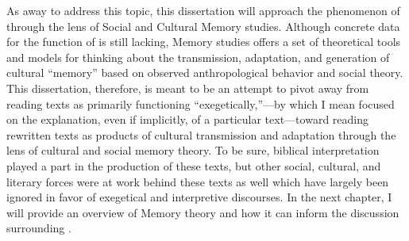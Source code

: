 As away to address this topic, this dissertation will approach the phenomenon of \rwb through the lens of Social and Cultural Memory studies. Although concrete data for the function of \rwb is still lacking, Memory studies offers a set of theoretical tools and models for thinking about the transmission, adaptation, and generation of cultural ``memory'' based on observed anthropological behavior and social theory. This dissertation, therefore, is meant to be an attempt to pivot away from reading \rwb texts as primarily functioning ``exegetically,''---by which I mean focused on the explanation, even if implicitly, of a particular text---toward reading rewritten texts as products of cultural transmission and adaptation through the lens of cultural and social memory theory. To be sure, biblical interpretation played a part in the production of these texts, but other social, cultural, and literary forces were at work behind these texts as well which have largely been ignored in favor of exegetical and interpretive discourses. In the next chapter, I will provide an overview of Memory theory and how it can inform the discussion surrounding \rwb.

